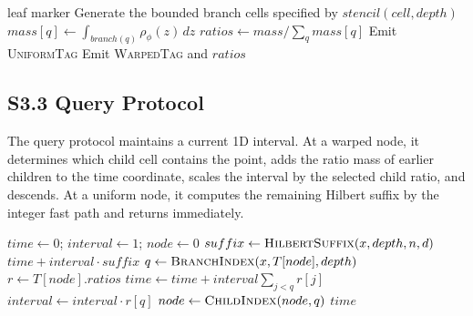\documentclass[11pt]{article}
\begin{document}
\begin{algorithm}[t]
\caption{\textsc{BuildRecipeTree}: density-ratio recipe construction}
\label{alg:si-build-recipe-tree}
\begin{algorithmic}[1]
        \State \Return leaf marker
    \EndIf
    \State Generate the bounded branch cells specified by $stencil(cell,depth)$
        \State $mass[q]\gets \int_{branch(q)}\rho_\phi(z)\,dz$
    \EndFor
    \State $ratios\gets mass/\sum_qmass[q]$
        \State Emit \textsc{UniformTag}
    \Else
        \State Emit \textsc{WarpedTag} and $ratios$
            \State {}
        \EndFor
    \EndIf
\EndProcedure
\end{algorithmic}
\end{algorithm}

\subsection*{S3.3 Query Protocol}
The query protocol maintains a current 1D interval. At a warped node, it determines which child cell contains the point, adds the ratio mass of earlier children to the time coordinate, scales the interval by the selected child ratio, and descends. At a uniform node, it computes the remaining Hilbert suffix by the integer fast path and returns immediately.

\begin{algorithm}[t]
\caption{\textsc{QueryRecipeTree}: full lookup protocol}
\label{alg:si-query-recipe-tree}
\begin{algorithmic}[1]
    \State $time\gets0$; $interval\gets1$; $node\gets0$
            \State $suffix\gets \Call{HilbertSuffix}{x,depth,n,d}$
            \State \Return $time+interval\cdot suffix$
        \EndIf
        \State $q\gets\Call{BranchIndex}{x,T[node],depth}$
        \State $r\gets T[node].ratios$
        \State $time\gets time+interval\sum_{j<q}r[j]$
        \State $interval\gets interval\cdot r[q]$
        \State $node\gets\Call{ChildIndex}{node,q}$
    \EndFor
    \State \Return $time$
\EndProcedure
\end{algorithmic}
\end{algorithm}
\end{document}

